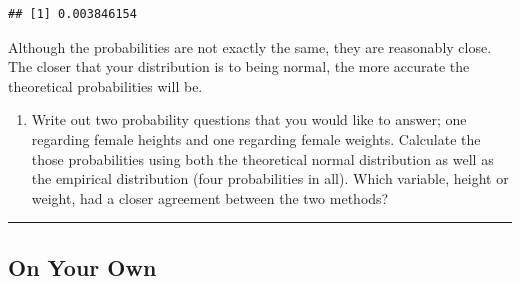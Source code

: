 \documentclass[]{article}
\newenvironment{Shaded}{\begin{snugshade}}{\end{snugshade}}
\newcommand{\KeywordTok}[1]{\textcolor[rgb]{0.13,0.29,0.53}{\textbf{{#1}}}}
\newcommand{\DecValTok}[1]{\textcolor[rgb]{0.00,0.00,0.81}{{#1}}}
\newcommand{\StringTok}[1]{\textcolor[rgb]{0.31,0.60,0.02}{{#1}}}
\newcommand{\NormalTok}[1]{{#1}}
\providecommand{\tightlist}{%
  \setlength{\itemsep}{0pt}\setlength{\parskip}{0pt}}
\begin{document}
\begin{Shaded}
\end{Shaded}

\begin{verbatim}
## [1] 0.003846154
\end{verbatim}

Although the probabilities are not exactly the same, they are reasonably
close. The closer that your distribution is to being normal, the more
accurate the theoretical probabilities will be.

\begin{enumerate}
\def\labelenumi{\arabic{enumi}.}
\setcounter{enumi}{5}
\tightlist
\item
  Write out two probability questions that you would like to answer; one
  regarding female heights and one regarding female weights. Calculate
  the those probabilities using both the theoretical normal distribution
  as well as the empirical distribution (four probabilities in all).
  Which variable, height or weight, had a closer agreement between the
  two methods?
\end{enumerate}

\begin{center}\rule{0.5\linewidth}{\linethickness}\end{center}

\subsection{On Your Own}\label{on-your-own}
\end{document}
